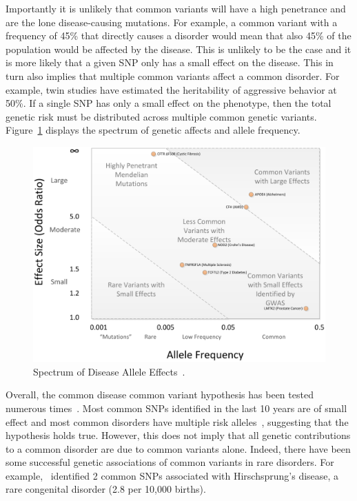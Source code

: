 Importantly it is unlikely that common variants will have a high penetrance and are the lone disease-causing mutations.
For example, a common variant with a frequency of 45\% that directly causes a disorder would mean that also 45\% of the population would be affected by the disease.
This is unlikely to be the case and it is more likely that a given SNP only has a small effect on the disease.
This in turn also implies that multiple common variants affect a common disorder.
For example, twin studies have estimated the heritability of aggressive behavior at 50\%.
If a single SNP has only a small effect on the phenotype, then the total genetic risk must be distributed across multiple common genetic variants.
Figure~\ref{fig:rare_comon} displays the spectrum of genetic affects and allele frequency.
\begin{figure}[htpb]
  \centering
  \includegraphics[width=0.8\linewidth]{introduction/figure/maf_effectsize.png}
  \caption[Spectrum of Disease Allele Effects]{Spectrum of Disease Allele Effects~\cite{Bush2012}.}\label{fig:rare_comon}
\end{figure}

Overall, the common disease common variant hypothesis has been tested numerous times~\cite{Bush2012}.
Most common SNPs identified in the last 10 years are of small effect and most common disorders have multiple risk alleles~\cite{Welter2014,Schork2010}, suggesting that the hypothesis holds true. 
However, this does not imply that all genetic contributions to a common disorder are due to common variants alone.
Indeed, there have been some successful genetic associations of common variants in rare disorders.
For example,~\cite{Garcia-Barcelo2009a} identified 2 common SNPs associated with Hirschsprung's disease, a rare congenital disorder (2.8 per 10,000 births).

